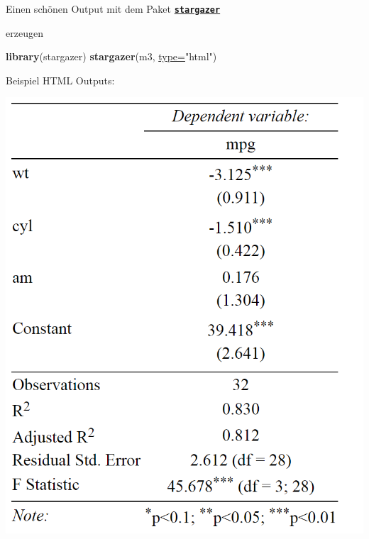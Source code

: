 \documentclass[
  ignorenonframetext,
]{beamer}
\newenvironment{Shaded}{\begin{snugshade}}{\end{snugshade}}
\newcommand{\DataTypeTok}[1]{\textcolor[rgb]{0.74,0.68,0.62}{\underline{#1}}}
\newcommand{\KeywordTok}[1]{\textcolor[rgb]{0.26,0.66,0.93}{\textbf{#1}}}
\newcommand{\NormalTok}[1]{\textcolor[rgb]{0.74,0.68,0.62}{#1}}
\newcommand{\StringTok}[1]{\textcolor[rgb]{0.02,0.61,0.04}{#1}}
\begin{document}
\begin{frame}[fragile]{Einen schönen Output mit dem Paket
\href{https://cran.r-project.org/web/packages/stargazer/vignettes/stargazer.pdf}{\textbf{\texttt{stargazer}}}}
\protect\hypertarget{einen-schonen-output-mit-dem-paket-stargazer}{}

erzeugen

\begin{Shaded}
\begin{Highlighting}[]
\KeywordTok{library}\NormalTok{(stargazer)}
\KeywordTok{stargazer}\NormalTok{(m3, }\DataTypeTok{type=}\StringTok{"html"}\NormalTok{)}
\end{Highlighting}
\end{Shaded}

\begin{block}{Beispiel HTML Outputs:}

\includegraphics{figure/stargazertabex.PNG}

\end{block}

\end{frame}
\end{document}
